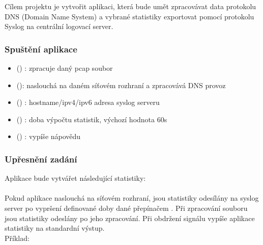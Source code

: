 \documentclass[11pt, a4paper, titlepage]{article}
\begin{document}
Cílem projektu je vytvořit aplikaci, která bude umět zpracovávat data protokolu DNS (Domain Name System) a vybrané statistiky exportovat pomocí protokolu Syslog na centrální logovací server.


\subsubsection*{Spuštění aplikace}


\begin{itemize}
	\item {} () : zpracuje daný pcap soubor
	\item {} (): naslouchá na daném síťovém rozhraní a zpracovává DNS provoz
	\item {} () : hostname/ipv4/ipv6 adresa syslog serveru
	\item {} () : doba výpočtu statistik, výchozí hodnota 60s
	\item {} () : vypíše nápovědu
\end{itemize}


\subsubsection*{Upřesnění zadání}

Aplikace bude vytvářet následující statistiky:\\
\\

Pokud aplikace naslouchá na síťovém rozhraní, jsou statistiky odesílány na syslog server po vypršení definované doby dané přepínačem . Při zpracování  souboru jsou statistiky odeslány po jeho zpracování. Při obdržení signálu  vypíše aplikace statistiky na standardní výstup.\\

Příklad:\\

\end{document}
